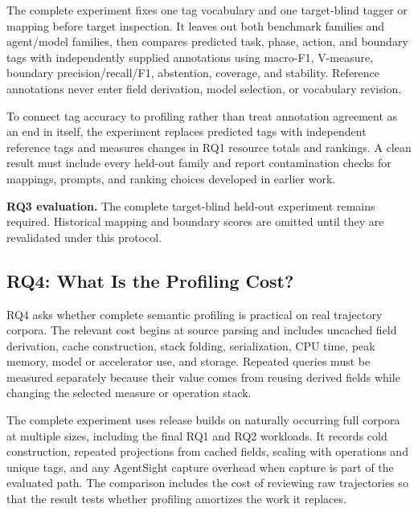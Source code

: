 \documentclass[letterpaper]{article}
\begin{document}
The complete experiment fixes one tag vocabulary and one target-blind tagger or
mapping before target inspection. It leaves out both benchmark families and
agent/model families, then compares predicted task, phase, action, and boundary
tags with independently supplied annotations using macro-F1, V-measure,
boundary precision/recall/F1, abstention, coverage, and stability. Reference
annotations never enter field derivation, model selection, or vocabulary
revision.

To connect tag accuracy to profiling rather than treat annotation agreement as
an end in itself, the experiment replaces predicted tags with independent
reference tags and measures changes in RQ1 resource totals and rankings. A
clean result must include every held-out family and report contamination checks
for mappings, prompts, and ranking choices developed in earlier work.

\textbf{RQ3 evaluation.} The complete target-blind held-out experiment remains
required. Historical mapping and boundary scores are omitted until they are
revalidated under this protocol.

\subsection{RQ4: What Is the Profiling Cost?}

RQ4 asks whether complete semantic profiling is practical on real trajectory
corpora. The relevant cost begins at source parsing and includes uncached field
derivation, cache construction, stack folding, serialization, CPU time, peak
memory, model or accelerator use, and storage. Repeated queries must be measured
separately because their value comes from reusing derived fields while changing
the selected measure or operation stack.

The complete experiment uses release builds on naturally occurring full
corpora at multiple sizes, including the final RQ1 and RQ2 workloads. It records
cold construction, repeated projections from cached fields, scaling with operations and unique
tags, and any AgentSight capture overhead when capture is part of the evaluated
path. The comparison includes the cost of reviewing raw trajectories so that
the result tests whether profiling amortizes the work it replaces.
\end{document}
